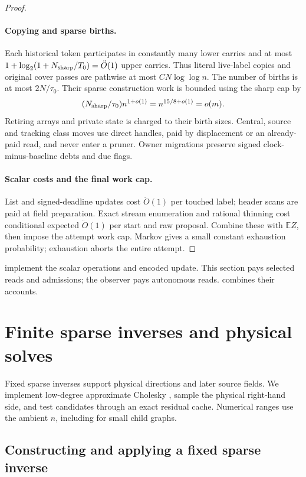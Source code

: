 \documentclass[11pt]{article}
\theoremstyle{remark}
\newcommand{\Ex}{\mathbb E}
\renewcommand{\O}{\ddot{O}}
\begin{document}
\begin{proof}
\paragraph{Copying and sparse births.}
Each historical token participates in constantly many lower carries and at most
$1+\log_2(1+N_{\rm sharp}/T_0)=\O(1)$ upper carries.
Thus literal live-label copies and original cover passes are pathwise at most
$CN\log\log n$.
The number of births is at most $2N/\tau_0$.
Their sparse construction work is bounded using the sharp cap by
\[
 (N_{\rm sharp}/\tau_0)n^{1+o(1)}
            =n^{15/8+o(1)}=o(m).
\]
Retiring arrays and private state is charged to their birth sizes.
Central, source and tracking class moves use direct handles, paid by
displacement or an already-paid read, and never enter a pruner.
Owner migrations preserve signed clock-minus-baseline debts and due flags.

\paragraph{Scalar costs and the final work cap.}
List and signed-deadline updates cost $\O(1)$ per touched label; header
scans are paid at field preparation.
Exact stream enumeration and rational thinning cost conditional expected $\O(1)$
per start and raw proposal.
Combine these with $\Ex Z$, then impose the attempt work cap.
Markov gives a small constant exhaustion probability; exhaustion aborts the
entire attempt.
\end{proof}

 implement the scalar
operations and encoded update.
This section pays selected reads and admissions; the observer pays autonomous
reads.
 combines their accounts.

\section{Finite sparse inverses and physical solves}
\label{sec:ram27-linear}

Fixed sparse inverses support physical directions and later source fields.
We implement low-degree approximate Cholesky \cite[Theorem B.1]{KS16:conf},
sample the physical right-hand side, and test candidates through an exact
residual cache.
Numerical ranges use the ambient $n$, including for small child graphs.

\subsection{Constructing and applying a fixed sparse inverse}
\end{document}
